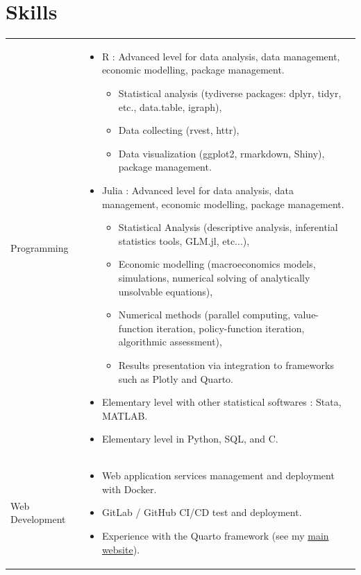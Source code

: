 \documentclass[a4paper,12pt]{article}
\begin{document}
\section{Skills}
\begin{tabularx}{\linewidth}{@{}l X@{}}
    Programming & \begin{itemize}
        \item R : Advanced level for data analysis, data management, economic modelling, package management.
        \begin{itemize}
            \item Statistical analysis (tydiverse packages: dplyr, tidyr, etc., data.table, igraph),
            \item Data collecting (rvest, httr),
            \item Data visualization (ggplot2, rmarkdown, Shiny), package management.
        \end{itemize}
        \item Julia : Advanced level for data analysis, data management, economic modelling, package management.
        \begin{itemize}
            \item Statistical Analysis (descriptive analysis, inferential statistics tools, GLM.jl, etc...),
            \item Economic modelling (macroeconomics models, simulations, numerical solving of analytically unsolvable equations),
            \item Numerical methods (parallel computing, value-function iteration, policy-function iteration, algorithmic assessment),
            \item Results presentation via integration to frameworks such as Plotly and Quarto.
        \end{itemize}
        \item Elementary level with other statistical softwares : Stata, MATLAB.
        \item Elementary level in Python, SQL, and C.
    \end{itemize} \\

    Web Development  &
    \begin{itemize}
        \item Web application services management and deployment with Docker.
        \item GitLab / GitHub CI/CD test and deployment.
        \item Experience with the Quarto framework (see my \href{https://www.paulogcd.com}{ main website}).
    \end{itemize} \\


\end{tabularx}
\end{document}

